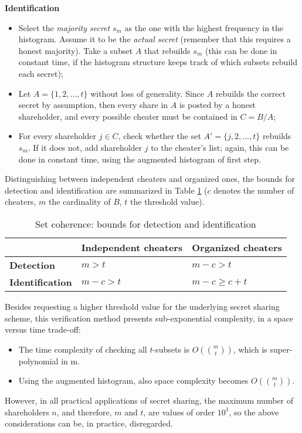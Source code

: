 \documentclass[10pt,journal,cspaper,compsoc]{IEEEtran}
\begin{document}
\textbf{Identification}

\begin{itemize}
\item{Select the \emph{majority secret} $s_m$ as the one with the highest frequency in the histogram. Assume it to be the
\emph{actual secret} (remember that this requires a honest majority). Take a subset $A$
that rebuilds $s_m$ (this can be done in constant time, if the histogram structure
keeps track of which subsets rebuild each secret)};
\item{Let $A = \{1,2,\ldots,t\}$ without loss of generality. Since $A$ rebuilds the correct secret
by assumption, then every share in $A$ is posted by a honest shareholder, and every possible cheater must be contained in
$C = B/A$};
\item{For every shareholder $j \in C$, check whether the set ${A'=\{j,2,\ldots,t\}}$
rebuilds $s_m$. If it does not, add shareholder $j$ to the cheater's list; again, this can be done in constant time, using the
augmented histogram of first step.}
\end{itemize}

Distinguishing between independent cheaters and organized ones, the bounds for detection and identification are summarized
in Table \ref{table2} ($c$ denotes the number of cheaters, $m$ the cardinality of $B$, $t$ the threshold value).
    
    \begin{table}
    \renewcommand{\arraystretch}{1.3}
     \caption{Set coherence: bounds for detection and identification}
\label{table2}
\centering
    \begin{tabular}{l|l|l}
    \hline
    ~              & \bfseries Independent cheaters &  \bfseries Organized cheaters \\ 
    \hline
    \hline
  \bfseries  Detection      & $m>t$                & $m-c>t$            \\ \hline
 \bfseries   Identification & $m-c>t$              & $m-c \geq c+t$     \\ \hline
    \end{tabular}
    \end{table}

\begin{rem}
Besides requesting a higher threshold value for the underlying secret sharing scheme, this verification method presents sub-exponential complexity, in a space versus time trade-off:
\begin{itemize}
\item{The time complexity of checking all $t$-subsets is $O(\binom {m} {t})$, which is super-polynomial in m.}
\item{Using the augmented histogram, also space complexity becomes $O(\binom {m} {t})$.}
\end{itemize}
However, in all practical applications of secret sharing, the maximum number of shareholders $n$, and therefore, $m$
and $t$, are values of order $10^1$, so the above considerations can be, in practice, disregarded.
\end{rem}
\end{document}
